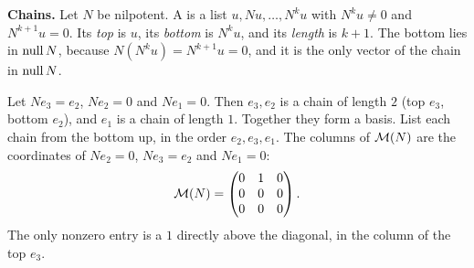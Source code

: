 \documentclass[10pt]{scrartcl}
\begin{document}
\begin{fig}
\end{fig}

\textbf{Chains.} Let $N$ be nilpotent. A  is a list $u,Nu,\dots,N^ku$ with $N^ku\ne0$ and $N^{k+1}u=0$. Its \emph{top} is $u$, its \emph{bottom} is $N^ku$, and its \emph{length} is $k+1$. The bottom lies in $\operatorname{null} N$, because $N(N^ku)=N^{k+1}u=0$, and it is the only vector of the chain in $\operatorname{null} N$.

\begin{example*}
  Let $Ne_3=e_2$, $Ne_2=0$ and $Ne_1=0$. Then $e_3,e_2$ is a chain of length $2$ (top $e_3$, bottom $e_2$), and $e_1$ is a chain of length $1$. Together they form a basis. List each chain from the bottom up, in the order $e_2,e_3,e_1$. The columns of $\mathcal M(N)$ are the coordinates of $Ne_2=0$, $Ne_3=e_2$ and $Ne_1=0$:
  \[ \mathcal M(N)=\begin{pmatrix}0&1&0\\0&0&0\\0&0&0\end{pmatrix}. \]
  The only nonzero entry is a $1$ directly above the diagonal, in the column of the top $e_3$.
\end{example*}
\end{document}
